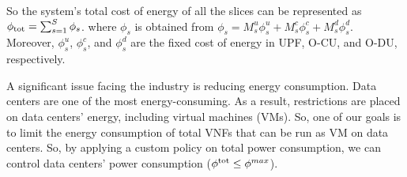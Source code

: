 \documentclass[lettersize,journal]{IEEEtran}
\begin{document}
So the system's total cost of energy of all the slices can be represented as $\textstyle \phi_{\text{\text{tot}}} = \sum_{s=1}^{S}\phi_{s}$.
where $\phi_{s}$ is obtained from $\phi_{s} = M_s^u \phi_s^u + M_s^c \phi_s^c+ M_s^d \phi_s^d.$
Moreover, $\phi_s^u$, $\phi_s^c$, and $\phi_s^d$ are the fixed cost of energy in UPF, O-CU, and O-DU, respectively.

A significant issue facing the industry is reducing energy consumption. Data centers are one of the most energy-consuming. As a result, restrictions are placed on data centers' energy, including virtual machines (VMs). So, one of our goals is to limit the energy consumption of total VNFs that can be run as VM on data centers. So, by applying a custom policy on total power consumption, we can control data centers' power consumption ($\phi^{\text{\text{tot}}}  \leq \phi^{max}$).
\end{document}
